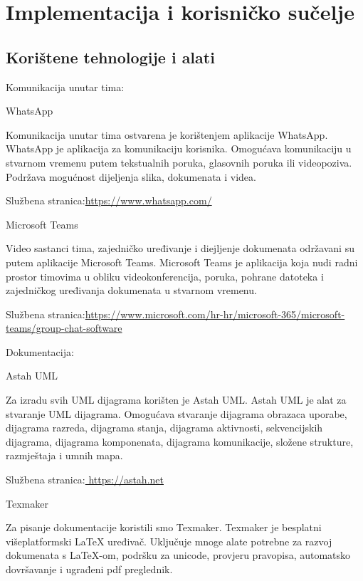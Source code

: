 \chapter{Implementacija i korisničko sučelje}
		
		
		\section{Korištene tehnologije i alati}
		
			\textbf{\textit{}}
			
Komunikacija unutar tima:
\vspace{4mm}
	
WhatsApp

Komunikacija unutar tima ostvarena je korištenjem aplikacije WhatsApp. 
WhatsApp je aplikacija za komunikaciju korisnika. Omogućava komunikaciju u stvarnom vremenu putem tekstualnih poruka, glasovnih poruka ili videopoziva. Podržava mogućnost dijeljenja slika, dokumenata i videa.

Službena stranica:\url{https://www.whatsapp.com/} 
\vspace{3mm}

Microsoft Teams

Video sastanci tima, zajedničko uređivanje i diejljenje dokumenata održavani su putem aplikacije Microsoft Teams. 
Microsoft Teams je aplikacija koja nudi radni prostor timovima u obliku videokonferencija, poruka, pohrane datoteka i zajedničkog uređivanja dokumenata u stvarnom vremenu. 

Službena stranica:\url{https://www.microsoft.com/hr-hr/microsoft-365/microsoft-teams/group-chat-software} 

\vspace{8mm}
Dokumentacija:
\vspace{4mm}

Astah UML 

Za izradu svih UML dijagrama korišten je Astah UML.
Astah UML je alat za stvaranje UML dijagrama. Omogućava stvaranje  dijagrama obrazaca uporabe, dijagrama razreda, dijagrama stanja, dijagrama aktivnosti, sekvencijskih dijagrama, dijagrama komponenata, dijagrama komunikacije, složene strukture, razmještaja i umnih mapa. 

Službena stranica:\url{ https://astah.net}
\vspace{3mm}

Texmaker

Za pisanje dokumentacije koristili smo Texmaker.
Texmaker je besplatni višeplatformski LaTeX uređivač. Uključuje mnoge alate potrebne za razvoj dokumenata s LaTeX-om, podršku za unicode, provjeru pravopisa, automatsko dovršavanje i ugrađeni pdf preglednik.

